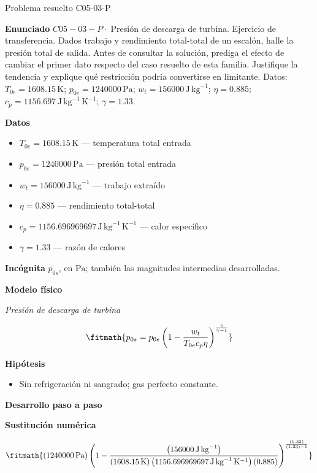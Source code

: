 \documentclass[10pt,openany]{book}
\begin{document}
\begin{studiumworked}{Problema resuelto C05-03-P}


\noindent\textbf{Enunciado}
\(C05-03-P \cdot\) Presión de descarga de turbina. Ejercicio de transferencia. Dados trabajo y rendimiento total-total de un escalón, halle la presión total de salida. Antes de consultar la solución, prediga el efecto de cambiar el primer dato respecto del caso resuelto de esta familia. Justifique la tendencia y explique qué restricción podría convertirse en limitante. Datos: \(T_{0e}=1608.15\, \mathrm{K}\); \(p_{0e}=1240000\, \mathrm{Pa}\); \(w_t=156000\, \mathrm{J}\,\mathrm{kg}^{-1}\); \(\eta=0.885\); \(c_p=1156.697\, \mathrm{J}\,\mathrm{kg}^{-1}\,\mathrm{K}^{-1}\); \(\gamma=1.33\).

\noindent\textbf{Datos}
\begin{itemize}
\item $T_{0e} = 1608.15\,\mathrm{K}$ — temperatura total entrada
\item $p_{0e} = 1240000\,\mathrm{Pa}$ — presión total entrada
\item $w_t = 156000\,\mathrm{J}\,\mathrm{kg}^{-1}$ — trabajo extraído
\item $\eta = 0.885$ — rendimiento total-total
\item $c_p = 1156.696969697\,\mathrm{J}\,\mathrm{kg}^{-1}\,\mathrm{K}^{-1}$ — calor específico
\item $\gamma = 1.33$ — razón de calores
\end{itemize}

\noindent\textbf{Incógnita}
$p_{0s}$, en $\mathrm{Pa}$; también las magnitudes intermedias desarrolladas.

\noindent\textbf{Modelo físico}

\noindent\textit{Presión de descarga de turbina}

\[
\fitmath{p_{0s}=p_{0e} \left(1 - \frac{w_t}{T_{0e} c_p \eta}\right)^{\frac{\gamma}{\gamma - 1}}}
\]

\noindent\textbf{Hipótesis}
\begin{itemize}
\item Sin refrigeración ni sangrado; gas perfecto constante.
\end{itemize}

\noindent\textbf{Desarrollo paso a paso}



\noindent\textbf{Sustitución numérica}

\[
\fitmath{\left(1240000\,\mathrm{Pa}\right) \left(1 - \frac{\left(156000\,\mathrm{J}\,\mathrm{kg}^{-1}\right)}{\left(1608.15\,\mathrm{K}\right) \left(1156.696969697\,\mathrm{J}\,\mathrm{kg}^{-1}\,\mathrm{K}^{-1}\right) \left(0.885\right)}\right)^{\frac{\left(1.33\right)}{\left(1.33\right) - 1}}}
\]


\end{studiumworked}
\end{document}
